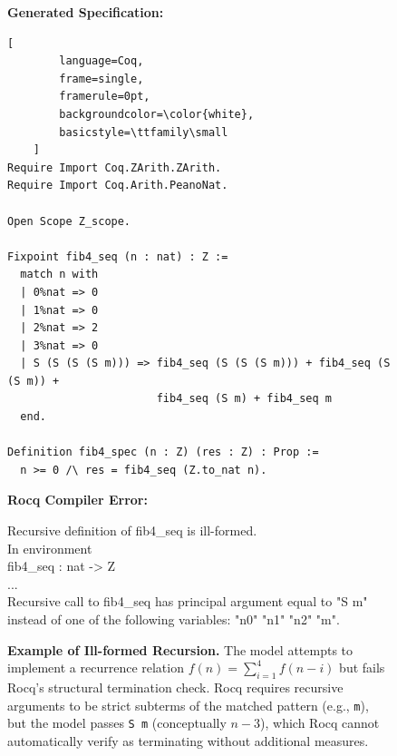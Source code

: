 \begin{figure}[h]
    \centering
    \begin{tcolorbox}[
        enhanced,
        title=\textbf{Case Study: Ill-formed Recursion in \texttt{fib4\_seq}},
        fonttitle=\bfseries\small,
        colback=blue!3!white,   
        colframe=blue!50!black,    
        boxrule=0.8pt,
        arc=2pt,
        breakable
    ]
    
    \textbf{Generated Specification:}
    \begin{lstlisting}[
        language=Coq, 
        frame=single, 
        framerule=0pt,             
        backgroundcolor=\color{white}, 
        basicstyle=\ttfamily\small
    ]
Require Import Coq.ZArith.ZArith.
Require Import Coq.Arith.PeanoNat.

Open Scope Z_scope.

Fixpoint fib4_seq (n : nat) : Z :=
  match n with
  | 0%nat => 0
  | 1%nat => 0
  | 2%nat => 2
  | 3%nat => 0
  | S (S (S (S m))) => fib4_seq (S (S (S m))) + fib4_seq (S (S m)) + 
                       fib4_seq (S m) + fib4_seq m
  end.

Definition fib4_spec (n : Z) (res : Z) : Prop :=
  n >= 0 /\ res = fib4_seq (Z.to_nat n).
    \end{lstlisting}

    \vspace{0.2cm}
    
    \textbf{Rocq Compiler Error:}
    \begin{tcolorbox}[
        colback=red!5!white,
        colframe=red!75!black,
        left=2pt, right=2pt, top=2pt, bottom=2pt,
        arc=0mm, boxrule=0.5pt,
        title=Compiler Output,
        fonttitle=\bfseries\scriptsize,
        coltitle=white
    ]
    \footnotesize\ttfamily\color{red!40!black}
    Recursive definition of fib4\_seq is ill-formed.\\
    In environment\\
    fib4\_seq : nat -> Z\\
    ...\\
    Recursive call to fib4\_seq has principal argument equal to "S m" instead of one of the following variables: "n0" "n1" "n2" "m".
    \end{tcolorbox}
    
    \end{tcolorbox}
    
    \caption{\textbf{Example of Ill-formed Recursion.} The model attempts to implement a recurrence relation $f(n) = \sum_{i=1}^{4} f(n-i)$ but fails Rocq's structural termination check. Rocq requires recursive arguments to be strict subterms of the matched pattern (e.g., \texttt{m}), but the model passes \texttt{S m} (conceptually $n-3$), which Rocq cannot automatically verify as terminating without additional measures.}
    \label{fig:bad_recursion_case}
\end{figure}